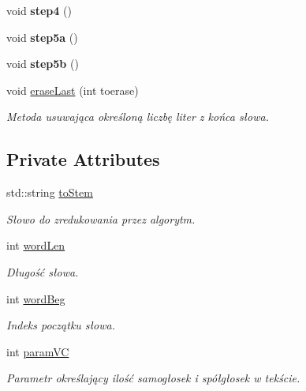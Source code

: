 \begin{DoxyCompactItemize}
\mbox{\label{class_porter_stemmer_ab22d3345b3d370083ed0b232cf0f25e7}} 
void {\bfseries step4} ()
\item 
\mbox{\label{class_porter_stemmer_ad694f08de38a6f2c96606870789fdfd6}} 
void {\bfseries step5a} ()
\item 
\mbox{\label{class_porter_stemmer_aef8d9bd582ac59ba634135fd074296de}} 
void {\bfseries step5b} ()
\item 
void \mbox{\hyperlink{class_porter_stemmer_afca7fe9d292c46afac56ecd8e18d59f4}{erase\+Last}} (int toerase)
\begin{DoxyCompactList}\small\item\em Metoda usuwająca określoną liczbę liter z końca słowa. \end{DoxyCompactList}\end{DoxyCompactItemize}
\subsection*{Private Attributes}
\begin{DoxyCompactItemize}
\item 
\mbox{\label{class_porter_stemmer_a6dd5b2da5e4a505c6c0b560493f8e688}} 
std\+::string \mbox{\hyperlink{class_porter_stemmer_a6dd5b2da5e4a505c6c0b560493f8e688}{to\+Stem}}
\begin{DoxyCompactList}\small\item\em Słowo do zredukowania przez algorytm. \end{DoxyCompactList}\item 
\mbox{\label{class_porter_stemmer_a7c9b63024d90aa531082288eb0235ea8}} 
int \mbox{\hyperlink{class_porter_stemmer_a7c9b63024d90aa531082288eb0235ea8}{word\+Len}}
\begin{DoxyCompactList}\small\item\em Długość słowa. \end{DoxyCompactList}\item 
\mbox{\label{class_porter_stemmer_a486d82e9bbe76f79114e7de52e1360d3}} 
int \mbox{\hyperlink{class_porter_stemmer_a486d82e9bbe76f79114e7de52e1360d3}{word\+Beg}}
\begin{DoxyCompactList}\small\item\em Indeks początku słowa. \end{DoxyCompactList}\item 
\mbox{\label{class_porter_stemmer_af9a90d4238d7de0c93f9dd0a4c8ced4a}} 
int \mbox{\hyperlink{class_porter_stemmer_af9a90d4238d7de0c93f9dd0a4c8ced4a}{param\+VC}}
\begin{DoxyCompactList}\small\item\em Parametr określający ilość samogłosek i spółgłosek w tekście. \end{DoxyCompactList}\end{DoxyCompactItemize}


